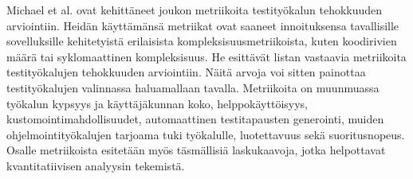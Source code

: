Michael et al. \cite{michael02} ovat kehittäneet joukon metriikoita testityökalun tehokkuuden arviointiin. Heidän käyttämänsä metriikat ovat saaneet innoituksensa tavallisille sovelluksille kehitetyistä erilaisista kompleksisuusmetriikoista, kuten koodirivien määrä tai syklomaattinen kompleksisuus. He esittävät listan vastaavia metriikoita testityökalujen tehokkuuden arviointiin. Näitä arvoja voi sitten painottaa testityökalujen valinnassa haluamallaan tavalla. Metriikoita on muunmuassa työkalun kypsyys ja käyttäjäkunnan koko, helppokäyttöisyys, kustomointimahdollisuudet, automaattinen testitapausten generointi, muiden ohjelmointityökalujen tarjoama tuki työkalulle, luotettavuus sekä suoritusnopeus. Osalle metriikoista esitetään myös täsmällisiä laskukaavoja, jotka helpottavat kvantitatiivisen analyysin tekemistä.


